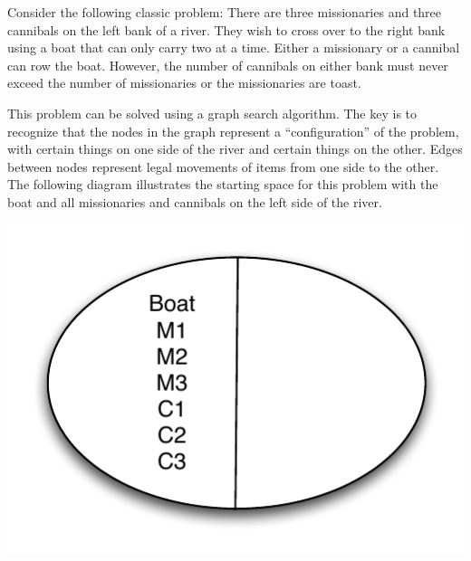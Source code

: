 \documentclass[11pt]{exam}
\begin{document}
\begin{questions}
\newpage
\question  Consider the following classic problem:  There are three missionaries and three cannibals on the left bank of a river.  They wish to cross over to the right bank using a boat that can only carry two at a time.  Either a missionary or a cannibal can row the boat.  However, the number of cannibals on either bank must never exceed the number of missionaries or the missionaries are toast. 

This problem can be solved using a graph search algorithm.  The key is to recognize that the nodes in the graph represent a ``configuration'' of the problem, with certain things on one side of the river and certain things on the other.  Edges between nodes represent legal movements of items from one side to the other.   The following diagram illustrates the starting space for this problem with the boat and all missionaries and cannibals on the left side of the river.

\includegraphics[scale=.5]{Missionaries}


\vspace{8in}


\end{questions}
\end{document}

